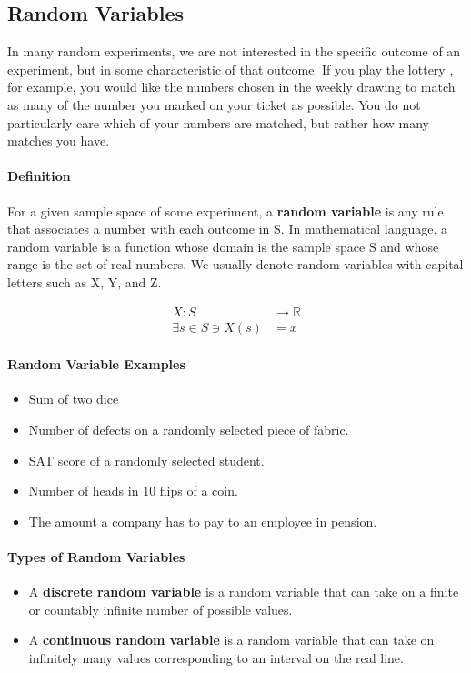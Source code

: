 \subsection{Random Variables}

\hrulefill

\vspace{5mm}

In many random experiments, we are not interested in the specific outcome of an experiment, but in some characteristic of
that outcome. If you play the lottery , for example, you would like the numbers chosen in the weekly drawing to match
as many of the number you marked on your ticket as possible. You do not particularly care which of your numbers are
matched, but rather how many matches you have.

\paragraph*{Definition}
For a given sample space of some experiment, a \textbf{random variable} is any rule that associates a number with 
each outcome in S. In mathematical language, a random variable is a function whose domain is the sample space S and whose
range is the set of real numbers. We usually denote random variables with capital letters such as X, Y, and Z.

\begin{align*}
    X: S &\to \mathbb{R} \\
    \exists s \in S \ni X(s) &= x
\end{align*}

\paragraph*{Random Variable Examples}
\begin{itemize}
    \item Sum of two dice
    \item Number of defects on a randomly selected piece of fabric.
    \item SAT score of a randomly selected student.
    \item Number of heads in 10 flips of a coin.
    \item The amount a company has to pay to an employee in pension.
\end{itemize}

\paragraph*{Types of Random Variables}
\begin{itemize}
    \item A \textbf{discrete random variable} is a random variable that can take on a finite or countably infinite
    number of possible values.
    \item A \textbf{continuous random variable} is a random variable that can take on infinitely many values corresponding
    to an interval on the real line.
\end{itemize}